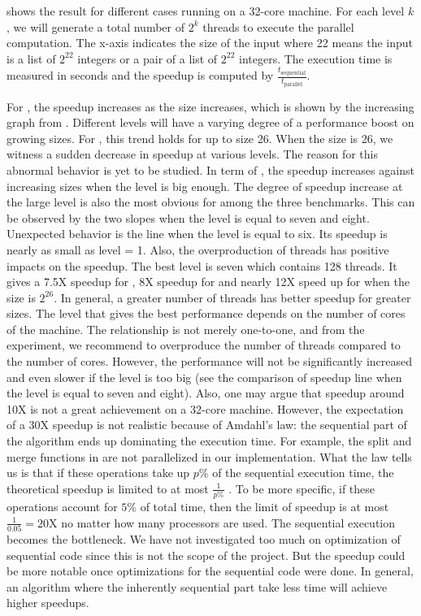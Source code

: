  shows the result for different cases running on a 32-core machine. For each level $k$, we will generate a total number of $2^k$ threads to execute the parallel computation. The x-axis indicates the size of the input where 22 means the input is a list of $2^{22}$ integers or a pair of a list of $2^{22}$ integers. The execution time is measured in seconds and the speedup is computed by $\frac{t_{\text{sequential}}}{t_\text{parallel}}$. 

For , the speedup increases as the size increases, which is shown by the increasing graph from . Different levels will have a varying degree of a performance boost on growing sizes. For , this trend holds for up to size 26. When the size is 26, we witness a sudden decrease in speedup at various levels. The reason for this abnormal behavior is yet to be studied. In term of , the speedup increases against increasing sizes when the level is big enough. The degree of speedup increase at the large level is also the most obvious for  among the three benchmarks. This can be observed by the two slopes when the level is equal to seven and eight. Unexpected behavior is the line when the level is equal to six. Its speedup is nearly as small as level = 1. Also, the overproduction of threads has positive impacts on the speedup. The best level is seven which contains 128 threads. It gives a 7.5X speedup for , 8X speedup for  and nearly 12X speed up for  when the size is $2^{26}$. In general, a greater number of threads has better speedup for greater sizes. The level that gives the best performance depends on the number of cores of the machine. The relationship is not merely one-to-one, and from the experiment, we recommend to overproduce the number of threads compared to the number of cores. However, the performance will not be significantly increased and even slower if the level is too big (see the comparison of speedup line when the level is equal to seven and eight). Also, one may argue that speedup around 10X is not a great achievement on a 32-core machine. However, the expectation of a 30X speedup is not realistic because of Amdahl's law: the sequential part of the algorithm ends up dominating the execution time. For example, the split and merge functions in  are not parallelized in our implementation. What the law tells us is that if these operations take up $p\%$ of the sequential execution time, the theoretical speedup is limited to at most $\frac{1}{p\%}$ \cite{amdahlValiditySingleProcessor1967}. To be more specific, if these operations account for $5\%$ of total time, then the limit of speedup is at most $\frac{1}{0.05} = 20$X no matter how many processors are used. The sequential execution becomes the bottleneck. We have not investigated too much on optimization of sequential code since this is not the scope of the project. But the speedup could be more notable once optimizations for the sequential code were done. In general, an algorithm where the inherently sequential part take less time will achieve higher speedups.